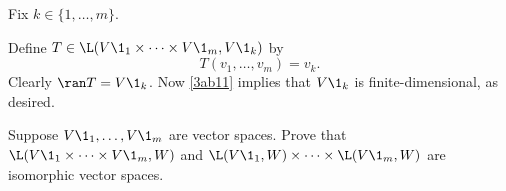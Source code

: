 \begin{Solution}
Fix $k \in \{1, \dots, m\}$.

Define $T \in \L(V\1_1 \times \dots \times V\1_m, V\1_k)$ by
\[
T(v_1, \dots, v_m) = v_k.
\]
Clearly $\ran T = V\1_k$. Now \ref{3ab11} implies that $V\1_k$ is finite-dimensional, as desired.
\end{Solution}

\exercise
Suppose $V\1_1, \dots, V\1_m$ are vector spaces. Prove that $\L(V\1_1 \times \dots \times V\1_m, W)$ and $\L(V\1_1, W) \times \dots \times \L(V\1_m, W)$ are isomorphic vector spaces.

